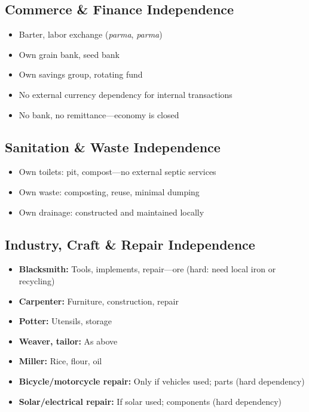 \documentclass[11pt,a4paper]{article}
\begin{document}
\subsection{Commerce \& Finance Independence}
\begin{itemize}
    \item Barter, labor exchange (\textit{parma}, \textit{parma})
    \item Own grain bank, seed bank
    \item Own savings group, rotating fund
    \item No external currency dependency for internal transactions
    \item No bank, no remittance---economy is closed
\end{itemize}

\subsection{Sanitation \& Waste Independence}
\begin{itemize}
    \item Own toilets: pit, compost---no external septic services
    \item Own waste: composting, reuse, minimal dumping
    \item Own drainage: constructed and maintained locally
\end{itemize}

\subsection{Industry, Craft \& Repair Independence}
\begin{itemize}
    \item \textbf{Blacksmith:} Tools, implements, repair---ore (hard: need local iron or recycling)
    \item \textbf{Carpenter:} Furniture, construction, repair
    \item \textbf{Potter:} Utensils, storage
    \item \textbf{Weaver, tailor:} As above
    \item \textbf{Miller:} Rice, flour, oil
    \item \textbf{Bicycle/motorcycle repair:} Only if vehicles used; parts (hard dependency)
    \item \textbf{Solar/electrical repair:} If solar used; components (hard dependency)
\end{itemize}
\end{document}
